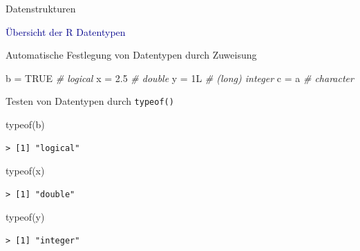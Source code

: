 \documentclass[
  8pt,
  ignorenonframetext,
]{beamer}
\newenvironment{Shaded}{\begin{snugshade}}{\end{snugshade}}
\newcommand{\CommentTok}[1]{\textcolor[rgb]{0.56,0.35,0.01}{\textit{#1}}}
\newcommand{\ConstantTok}[1]{\textcolor[rgb]{0.00,0.00,0.00}{#1}}
\newcommand{\FloatTok}[1]{\textcolor[rgb]{0.00,0.00,0.81}{#1}}
\newcommand{\FunctionTok}[1]{\textcolor[rgb]{0.00,0.00,0.00}{#1}}
\newcommand{\NormalTok}[1]{#1}
\newcommand{\OtherTok}[1]{\textcolor[rgb]{0.56,0.35,0.01}{#1}}
\newcommand{\StringTok}[1]{\textcolor[rgb]{0.31,0.60,0.02}{#1}}
\begin{document}
\begin{frame}[fragile]{Datenstrukturen}
\protect\hypertarget{datenstrukturen-5}{}
\vspace{1mm}

\textcolor{darkblue}{Übersicht der R Datentypen} \footnotesize

Automatische Festlegung von Datentypen durch Zuweisung \vspace{1mm}

\begin{Shaded}
\begin{Highlighting}[]
\NormalTok{b }\OtherTok{=} \ConstantTok{TRUE}                    \CommentTok{\# logical}
\NormalTok{x }\OtherTok{=} \FloatTok{2.5}                     \CommentTok{\# double}
\NormalTok{y }\OtherTok{=}\NormalTok{ 1L                      }\CommentTok{\# (long) integer}
\NormalTok{c }\OtherTok{=} \StringTok{\textquotesingle{}a\textquotesingle{}}                     \CommentTok{\# character}
\end{Highlighting}
\end{Shaded}

Testen von Datentypen durch \texttt{typeof()} \vspace{1mm}

\begin{Shaded}
\begin{Highlighting}[]
\FunctionTok{typeof}\NormalTok{(b)}
\end{Highlighting}
\end{Shaded}

\begin{verbatim}
> [1] "logical"
\end{verbatim}

\begin{Shaded}
\begin{Highlighting}[]
\FunctionTok{typeof}\NormalTok{(x)}
\end{Highlighting}
\end{Shaded}

\begin{verbatim}
> [1] "double"
\end{verbatim}

\begin{Shaded}
\begin{Highlighting}[]
\FunctionTok{typeof}\NormalTok{(y)}
\end{Highlighting}
\end{Shaded}

\begin{verbatim}
> [1] "integer"
\end{verbatim}


\end{frame}
\end{document}

